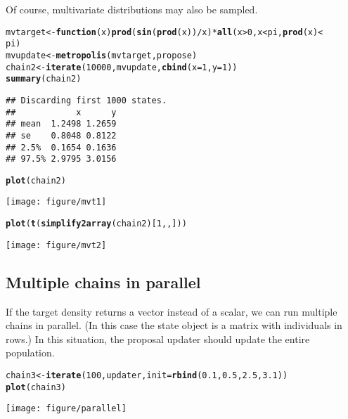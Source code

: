 \documentclass{article}\usepackage[]{graphicx}\usepackage[]{color}
\makeatletter
\def\maxwidth{ %
  \ifdim\Gin@nat@width>\linewidth
    \linewidth
  \else
    \Gin@nat@width
  \fi
}
\newcommand{\hlnum}[1]{\textcolor[rgb]{0.686,0.059,0.569}{#1}}%
\newcommand{\hlopt}[1]{\textcolor[rgb]{0,0,0}{#1}}%
\newcommand{\hlstd}[1]{\textcolor[rgb]{0.345,0.345,0.345}{#1}}%
\newcommand{\hlkwa}[1]{\textcolor[rgb]{0.161,0.373,0.58}{\textbf{#1}}}%
\newcommand{\hlkwb}[1]{\textcolor[rgb]{0.69,0.353,0.396}{#1}}%
\newcommand{\hlkwc}[1]{\textcolor[rgb]{0.333,0.667,0.333}{#1}}%
\newcommand{\hlkwd}[1]{\textcolor[rgb]{0.737,0.353,0.396}{\textbf{#1}}}%
\newenvironment{kframe}{%
 \def\at@end@of@kframe{}%
 \ifinner\ifhmode%
  \def\at@end@of@kframe{\end{minipage}}%
  \begin{minipage}{\columnwidth}%
 \fi\fi%
 \def\FrameCommand##1{\hskip\@totalleftmargin \hskip-\fboxsep
 \colorbox{shadecolor}{##1}\hskip-\fboxsep
     \hskip-\linewidth \hskip-\@totalleftmargin \hskip\columnwidth}%
 \MakeFramed {\advance\hsize-\width
   \@totalleftmargin\z@ \linewidth\hsize
   \@setminipage}}%
 {\par\unskip\endMakeFramed%
 \at@end@of@kframe}
\newenvironment{knitrout}{}{} %
\makeatother
\begin{document}
Of course, multivariate distributions may also be sampled. 
\begin{knitrout}
\color{fgcolor}\begin{kframe}
\begin{alltt}
\hlstd{mvtarget} \hlkwb{<-} \hlkwa{function}\hlstd{(}\hlkwc{x}\hlstd{)} \hlkwd{prod}\hlstd{(}\hlkwd{sin}\hlstd{(}\hlkwd{prod}\hlstd{(x))}\hlopt{/}\hlstd{x)} \hlopt{*} \hlkwd{all}\hlstd{(x} \hlopt{>} \hlnum{0}\hlstd{, x} \hlopt{<} \hlstd{pi,} \hlkwd{prod}\hlstd{(x)} \hlopt{<}
    \hlstd{pi)}
\hlstd{mvupdate} \hlkwb{<-} \hlkwd{metropolis}\hlstd{(mvtarget, propose)}
\hlstd{chain2} \hlkwb{<-} \hlkwd{iterate}\hlstd{(}\hlnum{10000}\hlstd{, mvupdate,} \hlkwd{cbind}\hlstd{(}\hlkwc{x} \hlstd{=} \hlnum{1}\hlstd{,} \hlkwc{y} \hlstd{=} \hlnum{1}\hlstd{))}
\hlkwd{summary}\hlstd{(chain2)}
\end{alltt}
\begin{verbatim}
## Discarding first 1000 states.
##            x      y
## mean  1.2498 1.2659
## se    0.8048 0.8122
## 2.5%  0.1654 0.1636
## 97.5% 2.9795 3.0156
\end{verbatim}
\begin{alltt}
\hlkwd{plot}\hlstd{(chain2)}
\end{alltt}
\end{kframe}
\texttt{[image: figure/mvt1]} 
\begin{kframe}\begin{alltt}
\hlkwd{plot}\hlstd{(}\hlkwd{t}\hlstd{(}\hlkwd{simplify2array}\hlstd{(chain2)[}\hlnum{1}\hlstd{, , ]))}
\end{alltt}
\end{kframe}
\texttt{[image: figure/mvt2]} 

\end{knitrout}


\subsection{Multiple chains in parallel}
If the target density returns a vector instead of a scalar, we can run
multiple chains in parallel. (In this case the state object is a
matrix with individuals in rows.) In this situation, the proposal
updater should update the entire population.
\begin{knitrout}
\color{fgcolor}\begin{kframe}
\begin{alltt}
\hlstd{chain3} \hlkwb{<-} \hlkwd{iterate}\hlstd{(}\hlnum{100}\hlstd{, updater,} \hlkwc{init} \hlstd{=} \hlkwd{rbind}\hlstd{(}\hlnum{0.1}\hlstd{,} \hlnum{0.5}\hlstd{,} \hlnum{2.5}\hlstd{,} \hlnum{3.1}\hlstd{))}
\hlkwd{plot}\hlstd{(chain3)}
\end{alltt}
\end{kframe}
\texttt{[image: figure/parallel]} 

\end{knitrout}
\end{document}
